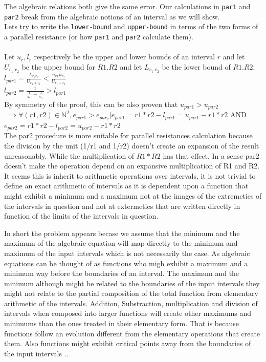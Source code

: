 \documentclass{article}
\begin{document}
\noindent The algebraic relations both give the same error. Our calculations in \texttt{par1} and \texttt{par2} break from the algebraic notions  of an interval as we will show.\\
Lets try to write the \texttt{lower-bound} and \texttt{upper-bound} in terms of the two forms of a parallel resistance (or how \texttt{par1} and \texttt{par2} calculate them).\\ \\
Let $u_{r} , l_{r}$ respectively be the upper and lower bounds of an interval $r$ and let $U_{r_1.r_2}$  be the upper bound for $R1.R2$ and let $L_{r_1.r_2}$ be the lower bound of $R1 . R2;$\\
\noindent$l_{par1} =  \frac{L_{r_1r_2}}{U_{r_1+ r_1}} < \frac{u_{r1}u_{r_2}}{U_{r_1+r_2}} $\\
\noindent$ l_{par2} = \frac{1}{\frac{1}{u_{r_1}} + \frac{1}{u_{r_2}}} > l_{par1} $\\
By symmetry of the proof, this can be also proven that $u_{par1} > u_{par2}$\\
$\implies \forall (r1,r2) \in \mathbb{N^2}, e_{par1} > e_{par_2} | e_{par1} = r1*r2 - l_{par1} = u_{par1} - r1*r2 $ AND $ e_{par2} = r1*r2 - l_{par2} = u_{par2} - r1*r2 $\\
\noindent The par2 procedure is more suitable for parallel resistances calculation because the division by the unit (1/r1 and 1/r2) doesn't create an expansion of the result unreasonably. While the multiplication of $R1*R2$ has that effect. In a sense par2 doesn't make the operation depend on an expansive multiplication of R1 and R2. It seems this is inherit to arithmetic operations over intervals, it is not trivial to define an exact arithmetic of intervals as it is dependent upon a function that might exhibit a minimum and a maximum not at the images of the extremeties of the intervals in question and not at extermeties that are written directly in function of the limits of the intervals in question.

\noindent In short the problem appears becase we assume that the minimum and the maximum of the algebraic equation will map directly to the minimum and maximum of the input intervals which is not necessarily the case. As algebraic equations can be thought of as functions who migh exhibit a maximum and a minimum way before the boundaries of an interval. The maximum and the minimum although might be related to the boundaries of the input intervals they might not relate to the partial composition of the total function from elementary arithmetic of the intervals. Addition, Substraction, multiplication and division of intervals when composed into larger functions will create other maximums and minimums than the ones treated in their elementary form. That is because functions follow an evolution different from the elementary operations that create them. Also functions might exhibit critical points away from the boundaries of the input intervals ..
\end{document}
